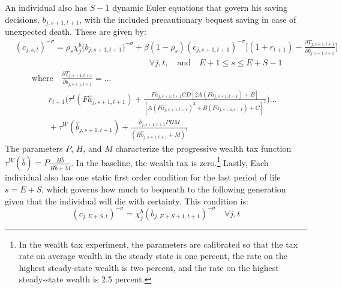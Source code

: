 \documentclass[letterpaper,12pt]{article}
\theoremstyle{definition}
\begin{document}
\begin{spacing}{1.5}
    An individual also has $S-1$ dynamic Euler equations that govern his saving decisions, $b_{j,s+1,t+1}$, with the included precautionary bequest saving in case of unexpected death. These are given by:
    \begin{equation}\label{EqEulerSavGen}
      \begin{split}
        &(c_{j,s,t})^{-\sigma} = \rho_s\chi^b_j\bigl(b_{j,s+1,t+1}\bigr)^{-\sigma} + \beta(1-\rho_s)(c_{j,s+1,t+1})^{-\sigma}\Biggl[(1 + r_{t+1}) - \frac{\partial T_{j,s+1,t+1}}{\partial b_{j,s+1,t+1}}\Biggr] \\
        &\qquad\qquad\qquad\qquad\qquad\qquad\qquad\qquad\forall j,t,\quad\text{and}\quad E+1\leq s \leq E+S-1 \\
        &\qquad\text{where}\quad \frac{\partial T_{j,s+1,t+1}}{\partial b_{j,s+1,t+1}} = ...\\
        &\qquad\qquad r_{t+1}\Biggl(\tau^I(F\hat{a}_{j,s+1,t+1}) + \frac{F\hat{a}_{j,s+1,t+1}CD\left[2A(F\hat{a}_{j,s+1,t+1}) + B\right]}{\left[A(F\hat{a}_{j,s+1,t+1})^2 + B(F\hat{a}_{j,s+1,t+1}) + C\right]^2}\Biggr) ... \\
        &\qquad\qquad + \tau^W(\hat{b}_{j,s+1,t+1}) + \frac{\hat{b}_{j,s+1,t+1}PHM}{\left(H\hat{b}_{j,s+1,t+1} + M\right)^2}
      \end{split}
    \end{equation}
    The parameters $P$, $H$, and $M$ characterize the progressive wealth tax function $\tau^W(\hat{b}) = P\frac{H\hat{b}}{H\hat{b}+M}$. In the baseline, the wealth tax is zero.\footnote{In the wealth tax experiment, the parameters are calibrated so that the tax rate on average wealth in the steady state is one percent, the rate on the highest steady-state wealth is two percent, and the rate on the highest steady-state wealth is 2.5 percent.} Lastly, Each individual also has one static first order condition for the last period of life $s=E+S$, which governs how much to bequeath to the following generation given that the individual will die with certainty.  This condition is:
    \begin{equation}\label{EqEulerSavEpS}
      (c_{j,E+S,t})^{-\sigma} = \chi^b_j(b_{j,E+S+1,t+1})^{-\sigma} \quad\forall j,t
    \end{equation}


\end{spacing}
\end{document}
